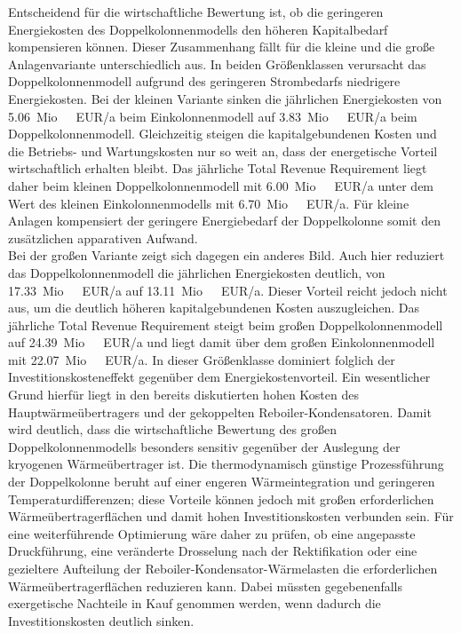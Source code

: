 Entscheidend für die wirtschaftliche Bewertung ist, ob die geringeren Energiekosten des Doppelkolonnenmodells den höheren Kapitalbedarf kompensieren können. Dieser Zusammenhang fällt für die kleine und die große Anlagenvariante unterschiedlich aus. In beiden Größenklassen verursacht das Doppelkolonnenmodell aufgrund des geringeren Strombedarfs niedrigere Energiekosten. Bei der kleinen Variante sinken die jährlichen Energiekosten von \SI{5.06}{Mio.\ EUR/a} beim Einkolonnenmodell auf \SI{3.83}{Mio.\ EUR/a} beim Doppelkolonnenmodell. Gleichzeitig steigen die kapitalgebundenen Kosten und die Betriebs- und Wartungskosten nur so weit an, dass der energetische Vorteil wirtschaftlich erhalten bleibt. Das jährliche Total Revenue Requirement liegt daher beim kleinen Doppelkolonnenmodell mit \SI{6.00}{Mio.\ EUR/a} unter dem Wert des kleinen Einkolonnenmodells mit \SI{6.70}{Mio.\ EUR/a}. Für kleine Anlagen kompensiert der geringere Energiebedarf der Doppelkolonne somit den zusätzlichen apparativen Aufwand.\\
Bei der großen Variante zeigt sich dagegen ein anderes Bild. Auch hier reduziert das Doppelkolonnenmodell die jährlichen Energiekosten deutlich, von \SI{17.33}{Mio.\ EUR/a} auf \SI{13.11}{Mio.\ EUR/a}. Dieser Vorteil reicht jedoch nicht aus, um die deutlich höheren kapitalgebundenen Kosten auszugleichen. Das jährliche Total Revenue Requirement steigt beim großen Doppelkolonnenmodell auf \SI{24.39}{Mio.\ EUR/a} und liegt damit über dem großen Einkolonnenmodell mit \SI{22.07}{Mio.\ EUR/a}. In dieser Größenklasse dominiert folglich der Investitionskosteneffekt gegenüber dem Energiekostenvorteil. Ein wesentlicher Grund hierfür liegt in den bereits diskutierten hohen Kosten des Hauptwärmeübertragers und der gekoppelten Reboiler-Kondensatoren. Damit wird deutlich, dass die wirtschaftliche Bewertung des großen Doppelkolonnenmodells besonders sensitiv gegenüber der Auslegung der kryogenen Wärmeübertrager ist. Die thermodynamisch günstige Prozessführung der Doppelkolonne beruht auf einer engeren Wärmeintegration und geringeren Temperaturdifferenzen; diese Vorteile können jedoch mit großen erforderlichen Wärmeübertragerflächen und damit hohen Investitionskosten verbunden sein. Für eine weiterführende Optimierung wäre daher zu prüfen, ob eine angepasste Druckführung, eine veränderte Drosselung nach der Rektifikation oder eine gezieltere Aufteilung der Reboiler-Kondensator-Wärmelasten die erforderlichen Wärmeübertragerflächen reduzieren kann. Dabei müssten gegebenenfalls exergetische Nachteile in Kauf genommen werden, wenn dadurch die Investitionskosten deutlich sinken.\\

